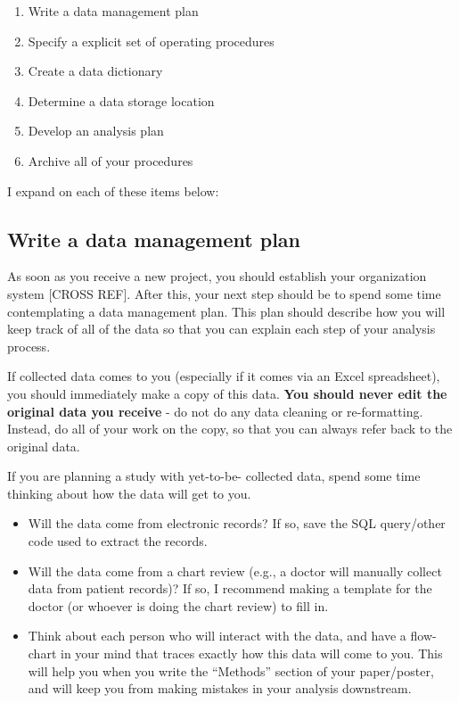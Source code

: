 \documentclass[
]{book}
\begin{document}
\begin{enumerate}
\def\labelenumi{\arabic{enumi}.}
\item
  Write a data management plan
\item
  Specify a explicit set of operating procedures
\item
  Create a data dictionary
\item
  Determine a data storage location
\item
  Develop an analysis plan
\item
  Archive all of your procedures
\end{enumerate}

I expand on each of these items below:

\hypertarget{write-a-data-management-plan}{%
\subsection{Write a data management plan}\label{write-a-data-management-plan}}

As soon as you receive a new project, you should establish your organization system {[}CROSS REF{]}. After this, your next step should be to spend some time contemplating a data management plan. This plan should describe how you will keep track of all of the data so that you can explain each step of your analysis process.

If collected data comes to you (especially if it comes via an Excel spreadsheet), you should immediately make a copy of this data. \textbf{You should never edit the original data you receive} - do not do any data cleaning or re-formatting. Instead, do all of your work on the copy, so that you can always refer back to the original data.

If you are planning a study with yet-to-be- collected data, spend some time thinking about how the data will get to you.

\begin{itemize}
\item
  Will the data come from electronic records? If so, save the SQL query/other code used to extract the records.
\item
  Will the data come from a chart review (e.g., a doctor will manually collect data from patient records)? If so, I recommend making a template for the doctor (or whoever is doing the chart review) to fill in.
\item
  Think about each person who will interact with the data, and have a flow-chart in your mind that traces exactly how this data will come to you. This will help you when you write the ``Methods'' section of your paper/poster, and will keep you from making mistakes in your analysis downstream.
\end{itemize}
\end{document}
